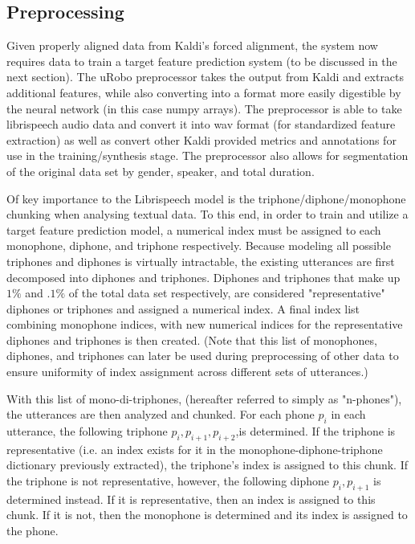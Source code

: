 \documentclass[10pt, journal, compsoc]{IEEEtran}
\begin{document}
\subsection{Preprocessing}
Given properly aligned data from Kaldi's forced alignment, the system now requires data to train a target feature prediction system (to be discussed in the next section). The uRobo preprocessor takes the output from Kaldi and extracts additional features, while also converting into a format more easily digestible by the neural network (in this case numpy arrays). The preprocessor is able to take librispeech audio data and convert it into wav format (for standardized feature extraction) as well as convert other Kaldi provided metrics and annotations for use in the training/synthesis stage. The preprocessor also allows for segmentation of the original data set by gender, speaker, and total duration.\par
Of key importance to the Librispeech model is the triphone/diphone/monophone chunking when analysing textual data. To this end, in order to train and utilize a target feature prediction model, a numerical index must be assigned to each monophone, diphone, and triphone respectively. Because modeling all possible triphones and diphones is virtually intractable, the existing utterances are first decomposed into diphones and triphones. Diphones and triphones that make up $1\%$ and $.1\%$ of the total data set respectively, are considered "representative" diphones or triphones and assigned a numerical index. A final index list combining monophone indices, with new numerical indices for the representative diphones and triphones is then created. (Note that this list of monophones, diphones, and triphones can later be used during preprocessing of other data to ensure uniformity of index assignment across different sets of utterances.)\par
With this list of mono-di-triphones, (hereafter referred to simply as "n-phones"), the utterances are then analyzed and chunked. For each phone $p_i$ in each utterance, the following triphone $p_i,p_{i+1},p_{i+2}$,is determined. If the triphone is representative (i.e. an index exists for it in the monophone-diphone-triphone dictionary previously extracted), the triphone's index is assigned to this chunk. If the triphone is not representative, however, the following diphone $p_i,p_{i+1}$ is determined instead. If it is representative, then an index is assigned to this chunk. If it is not, then the monophone is determined and its index is assigned to the phone.\par
\end{document}
